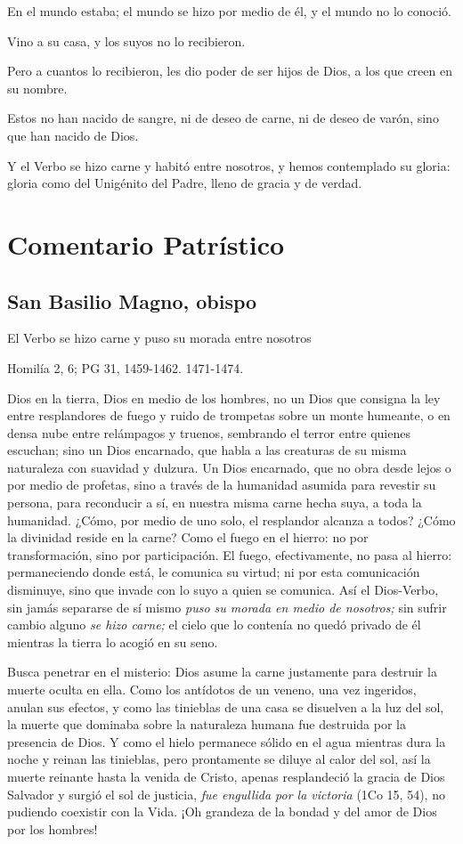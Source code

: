 En el mundo estaba; el mundo se hizo por medio de él, y el mundo no lo
conoció.

Vino a su casa, y los suyos no lo recibieron.

Pero a cuantos lo recibieron, les dio poder de ser hijos de Dios, a los
que creen en su nombre.

Estos no han nacido de sangre, ni de deseo de carne, ni de deseo de
varón, sino que han nacido de Dios.

Y el Verbo se hizo carne y habitó entre nosotros, y hemos contemplado su
gloria: gloria como del Unigénito del Padre, lleno de gracia y de
verdad.

\section{Comentario Patrístico}

\subsection{San Basilio Magno, obispo}

El Verbo se hizo carne y puso su morada entre nosotros

Homilía 2, 6; PG 31, 1459-1462. 1471-1474.

Dios en la tierra, Dios en medio de los hombres, no un Dios que consigna la ley entre resplandores de fuego y ruido de trompetas sobre un monte humeante, o en densa nube entre relámpagos y truenos, sembrando el terror entre quienes escuchan; sino un Dios encarnado, que habla a las creaturas de su misma naturaleza con suavidad y dulzura. Un Dios encarnado, que no obra desde lejos o por medio de profetas, sino a través de la humanidad asumida para revestir su persona, para reconducir a sí, en nuestra misma carne hecha suya, a toda la humanidad. ¿Cómo, por medio de uno solo, el resplandor alcanza a todos? ¿Cómo la divinidad reside en la carne? Como el fuego en el hierro: no por transformación, sino por participación. El fuego, efectivamente, no pasa al hierro: permaneciendo donde está, le comunica su virtud; ni por esta comunicación disminuye, sino que invade con lo suyo a quien se comunica. Así el Dios-Verbo, sin jamás separarse de sí mismo \emph{puso su morada en medio de nosotros;} sin sufrir cambio alguno \emph{se hizo carne;} el cielo que lo contenía no quedó privado de él mientras la tierra lo acogió en su seno.

Busca penetrar en el misterio: Dios asume la carne justamente para destruir la muerte oculta en ella. Como los antídotos de un veneno, una vez ingeridos, anulan sus efectos, y como las tinieblas de una casa se disuelven a la luz del sol, la muerte que dominaba sobre la naturaleza humana fue destruida por la presencia de Dios. Y como el hielo permanece sólido en el agua mientras dura la noche y reinan las tinieblas, pero prontamente se diluye al calor del sol, así la muerte reinante hasta la venida de Cristo, apenas resplandeció la gracia de Dios Salvador y surgió el sol de justicia, \emph{fue engullida por la victoria} (1Co 15, 54), no pudiendo coexistir con la Vida. ¡Oh grandeza de la bondad y del amor de Dios por los hombres!

